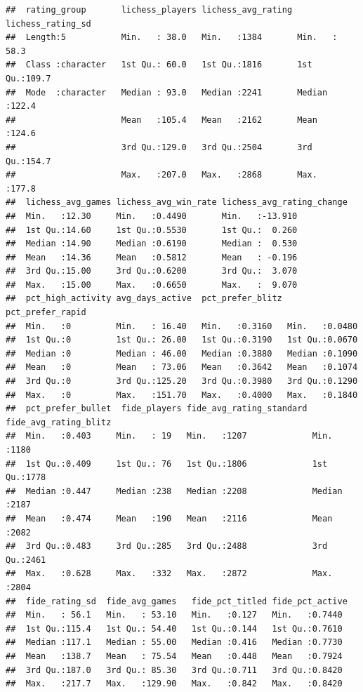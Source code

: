 \documentclass[
]{article}
\begin{document}
\begin{verbatim}
##  rating_group       lichess_players lichess_avg_rating lichess_rating_sd
##  Length:5           Min.   : 38.0   Min.   :1384       Min.   : 58.3    
##  Class :character   1st Qu.: 60.0   1st Qu.:1816       1st Qu.:109.7    
##  Mode  :character   Median : 93.0   Median :2241       Median :122.4    
##                     Mean   :105.4   Mean   :2162       Mean   :124.6    
##                     3rd Qu.:129.0   3rd Qu.:2504       3rd Qu.:154.7    
##                     Max.   :207.0   Max.   :2868       Max.   :177.8    
##  lichess_avg_games lichess_avg_win_rate lichess_avg_rating_change
##  Min.   :12.30     Min.   :0.4490       Min.   :-13.910          
##  1st Qu.:14.60     1st Qu.:0.5530       1st Qu.:  0.260          
##  Median :14.90     Median :0.6190       Median :  0.530          
##  Mean   :14.36     Mean   :0.5812       Mean   : -0.196          
##  3rd Qu.:15.00     3rd Qu.:0.6200       3rd Qu.:  3.070          
##  Max.   :15.00     Max.   :0.6650       Max.   :  9.070          
##  pct_high_activity avg_days_active  pct_prefer_blitz pct_prefer_rapid
##  Min.   :0         Min.   : 16.40   Min.   :0.3160   Min.   :0.0480  
##  1st Qu.:0         1st Qu.: 26.00   1st Qu.:0.3190   1st Qu.:0.0670  
##  Median :0         Median : 46.00   Median :0.3880   Median :0.1090  
##  Mean   :0         Mean   : 73.06   Mean   :0.3642   Mean   :0.1074  
##  3rd Qu.:0         3rd Qu.:125.20   3rd Qu.:0.3980   3rd Qu.:0.1290  
##  Max.   :0         Max.   :151.70   Max.   :0.4000   Max.   :0.1840  
##  pct_prefer_bullet  fide_players fide_avg_rating_standard fide_avg_rating_blitz
##  Min.   :0.403     Min.   : 19   Min.   :1207             Min.   :1180         
##  1st Qu.:0.409     1st Qu.: 76   1st Qu.:1806             1st Qu.:1778         
##  Median :0.447     Median :238   Median :2208             Median :2187         
##  Mean   :0.474     Mean   :190   Mean   :2116             Mean   :2082         
##  3rd Qu.:0.483     3rd Qu.:285   3rd Qu.:2488             3rd Qu.:2461         
##  Max.   :0.628     Max.   :332   Max.   :2872             Max.   :2804         
##  fide_rating_sd  fide_avg_games   fide_pct_titled fide_pct_active 
##  Min.   : 56.1   Min.   : 53.10   Min.   :0.127   Min.   :0.7440  
##  1st Qu.:115.4   1st Qu.: 54.40   1st Qu.:0.144   1st Qu.:0.7610  
##  Median :117.1   Median : 55.00   Median :0.416   Median :0.7730  
##  Mean   :138.7   Mean   : 75.54   Mean   :0.448   Mean   :0.7924  
##  3rd Qu.:187.0   3rd Qu.: 85.30   3rd Qu.:0.711   3rd Qu.:0.8420  
##  Max.   :217.7   Max.   :129.90   Max.   :0.842   Max.   :0.8420  

\end{verbatim}
\end{document}
